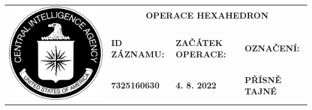 \documentclass[a4paper, 11pt]{article}
\newcommand{\blackcell}{\cellcolor{black} \color{white} \ttfamily \bfseries}
\begin{document}
	\noindent
	\begin{table}[H]
		\renewcommand\tabularxcolumn[1]{m{#1}}
		\def\arraystretch{1.5}
		\begin{tabularx}{\textwidth}{l X X X}
			\multirow{4}{*}{ \includegraphics[scale=0.22]{sources/CIA_logo.pdf} } & \multicolumn{3}{c}{\bfseries \ttfamily \Huge OPERACE HEXAHEDRON} \\
			&&&\\
			& \blackcell ID ZÁZNAMU: & \blackcell ZAČÁTEK OPERACE: & \blackcell OZNAČENÍ: \\
			& \blackcell 7325160630 & \blackcell 4. 8. 2022 & \blackcell PŘÍSNĚ TAJNÉ \\
			
		\end{tabularx}
	\end{table}
	
\end{document}

